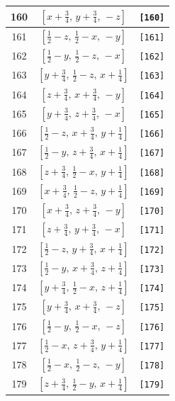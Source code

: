 \documentclass[fleqn,8pt]{jsarticle}
\begin{document}
\begin{longtable}{ccc}
160 & $\left[ x + \frac{3}{4},\, y + \frac{3}{4},\, - z \right]$ & {\tt [160]} \\ \hline
161 & $\left[ \frac{1}{2} - z,\, \frac{1}{2} - x,\, - y \right]$ & {\tt [161]} \\ \hline
162 & $\left[ \frac{1}{2} - y,\, \frac{1}{2} - z,\, - x \right]$ & {\tt [162]} \\ \hline
163 & $\left[ y + \frac{3}{4},\, \frac{1}{2} - z,\, x + \frac{1}{4} \right]$ & {\tt [163]} \\ \hline
164 & $\left[ z + \frac{3}{4},\, x + \frac{3}{4},\, - y \right]$ & {\tt [164]} \\ \hline
165 & $\left[ y + \frac{3}{4},\, z + \frac{3}{4},\, - x \right]$ & {\tt [165]} \\ \hline
166 & $\left[ \frac{1}{2} - z,\, x + \frac{3}{4},\, y + \frac{1}{4} \right]$ & {\tt [166]} \\ \hline
167 & $\left[ \frac{1}{2} - y,\, z + \frac{3}{4},\, x + \frac{1}{4} \right]$ & {\tt [167]} \\ \hline
168 & $\left[ z + \frac{3}{4},\, \frac{1}{2} - x,\, y + \frac{1}{4} \right]$ & {\tt [168]} \\ \hline
169 & $\left[ x + \frac{3}{4},\, \frac{1}{2} - z,\, y + \frac{1}{4} \right]$ & {\tt [169]} \\ \hline
170 & $\left[ x + \frac{3}{4},\, z + \frac{3}{4},\, - y \right]$ & {\tt [170]} \\ \hline
171 & $\left[ z + \frac{3}{4},\, y + \frac{3}{4},\, - x \right]$ & {\tt [171]} \\ \hline
172 & $\left[ \frac{1}{2} - z,\, y + \frac{3}{4},\, x + \frac{1}{4} \right]$ & {\tt [172]} \\ \hline
173 & $\left[ \frac{1}{2} - y,\, x + \frac{3}{4},\, z + \frac{1}{4} \right]$ & {\tt [173]} \\ \hline
174 & $\left[ y + \frac{3}{4},\, \frac{1}{2} - x,\, z + \frac{1}{4} \right]$ & {\tt [174]} \\ \hline
175 & $\left[ y + \frac{3}{4},\, x + \frac{3}{4},\, - z \right]$ & {\tt [175]} \\ \hline
176 & $\left[ \frac{1}{2} - y,\, \frac{1}{2} - x,\, - z \right]$ & {\tt [176]} \\ \hline
177 & $\left[ \frac{1}{2} - x,\, z + \frac{3}{4},\, y + \frac{1}{4} \right]$ & {\tt [177]} \\ \hline
178 & $\left[ \frac{1}{2} - x,\, \frac{1}{2} - z,\, - y \right]$ & {\tt [178]} \\ \hline
179 & $\left[ z + \frac{3}{4},\, \frac{1}{2} - y,\, x + \frac{1}{4} \right]$ & {\tt [179]} \\ \hline

\end{longtable}
\end{document}

